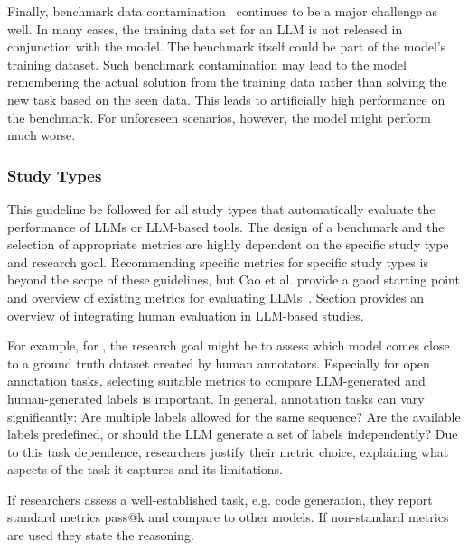 Finally, benchmark data contamination~\cite{DBLP:journals/corr/abs-2406-04244} continues to be a major challenge as well.
In many cases, the training data set for an LLM is not released in conjunction with the model.
The benchmark itself could be part of the model's training dataset.
Such benchmark contamination may lead to the model remembering the actual solution from the training data rather than solving the new task based on the seen data.
This leads to artificially high performance on the benchmark.
For unforeseen scenarios, however, the model might perform much worse.



\subsubsection{Study Types}

This guideline \must be followed for all study types that automatically evaluate the performance of LLMs or LLM-based tools.
The design of a benchmark and the selection of appropriate metrics are highly dependent on the specific study type and research goal.
Recommending specific metrics for specific study types is beyond the scope of these guidelines, but Cao et al. provide a good starting point and overview of existing metrics for evaluating LLMs~\cite{10.1145/3695988}.
Section \humanvalidation provides an overview of integrating human evaluation in LLM-based studies. 

For example, for \annotators, the research goal might be to assess which model comes close to a ground truth dataset created by human annotators.
Especially for open annotation tasks, selecting suitable metrics to compare LLM-generated and human-generated labels is important.
In general, annotation tasks can vary significantly: Are multiple labels allowed for the same sequence? Are the available labels predefined, or should the LLM generate a set of labels independently?
Due to this task dependence, researchers \must justify their metric choice, explaining what aspects of the task it captures and its limitations.

If researchers assess a well-established task, e.g. code generation, they \should report standard metrics pass@k and compare to other models.
If non-standard metrics are used they \must state the reasoning.

